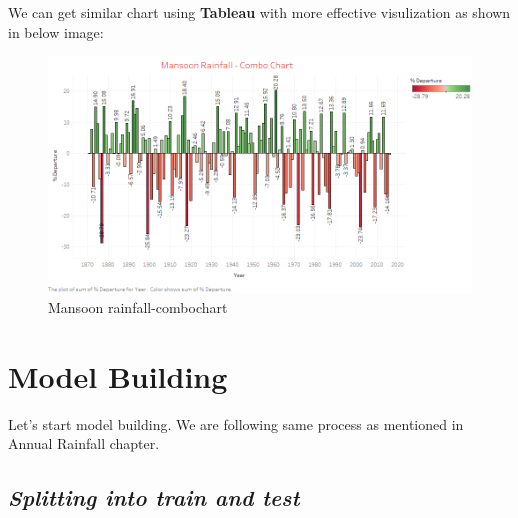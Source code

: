 \documentclass[12pt,openany]{book}
\newenvironment{Shaded}{\begin{snugshade}}{\end{snugshade}}
\newcommand{\CommentTok}[1]{\textcolor[rgb]{0.56,0.35,0.01}{\textit{#1}}}
\newcommand{\DecValTok}[1]{\textcolor[rgb]{0.00,0.00,0.81}{#1}}
\newcommand{\FloatTok}[1]{\textcolor[rgb]{0.00,0.00,0.81}{#1}}
\newcommand{\KeywordTok}[1]{\textcolor[rgb]{0.13,0.29,0.53}{\textbf{#1}}}
\newcommand{\NormalTok}[1]{#1}
\newcommand{\OperatorTok}[1]{\textcolor[rgb]{0.81,0.36,0.00}{\textbf{#1}}}
\newcommand{\StringTok}[1]{\textcolor[rgb]{0.31,0.60,0.02}{#1}}
\begin{document}
We can get similar chart using \textbf{Tableau} with more effective visulization as shown in below image:

\begin{figure}
\centering
\includegraphics{Mansoon_Rainfall_Combochart.png}
\caption{Mansoon rainfall-combochart}
\end{figure}

\hypertarget{model-building-1}{%
\section{Model Building}\label{model-building-1}}

Let's start model building. We are following same process as mentioned in Annual Rainfall chapter.

\hypertarget{splitting-into-train-and-test-1}{%
\subsection{\texorpdfstring{\textbf{\emph{Splitting into train and test}}}{Splitting into train and test}}\label{splitting-into-train-and-test-1}}

\begin{Shaded}
\end{Shaded}
\end{document}
